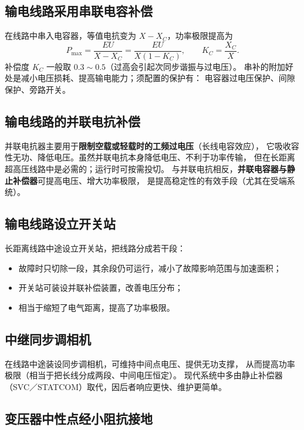 \subsection{输电线路采用串联电容补偿}

在线路中串入电容器，等值电抗变为 $X-X_C$，功率极限提高为
\begin{equation}
  P_{\max}=\frac{EU}{X-X_C}=\frac{EU}{X\left(1-K_C\right)},
  \qquad K_C=\frac{X_C}{X}.
\end{equation}
补偿度 $K_C$ 一般取 $0.3\sim0.5$（过高会引起次同步谐振与过电压）。
串补的附加好处是减小电压损耗、提高输电能力；须配置的保护有：
电容器过电压保护、间隙保护、旁路开关。

\subsection{输电线路的并联电抗补偿}

并联电抗器主要用于\textbf{限制空载或轻载时的工频过电压}（长线电容效应），
它吸收容性无功、降低电压。虽然并联电抗本身降低电压、不利于功率传输，
但在长距离超高压线路中是必需的；运行时可按需投切。
与并联电抗相反，\textbf{并联电容器与静止补偿器}可提高电压、增大功率极限，
是提高稳定性的有效手段（尤其在受端系统）。

\subsection{输电线路设立开关站}

长距离线路中途设立开关站，把线路分成若干段：
\begin{itemize}
  \item 故障时只切除一段，其余段仍可运行，减小了故障影响范围与加速面积；
  \item 开关站可装设并联补偿装置，改善电压分布；
  \item 相当于缩短了电气距离，提高了功率极限。
\end{itemize}

\subsection{中继同步调相机}

在线路中途装设同步调相机，可维持中间点电压、提供无功支撑，
从而提高功率极限（相当于把长线分成两段、中间电压恒定）。
现代系统中多由静止补偿器（SVC／STATCOM）取代，因后者响应更快、维护更简单。

\subsection{变压器中性点经小阻抗接地}

